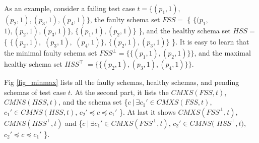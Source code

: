 {%
%
%
%
%
%
%
%

As an example, consider a failing test case $t = \{(p_{1}, 1),$ $ (p_{2}, 1), (p_{3}, 1), (p_{4}, 1)\}$, the faulty schema set $FSS =$ \{ $\{(p_{1}, $ $1), (p_{2}, 1), (p_{3}, 1)\}$, $\{(p_{1}, 1), (p_{2}, 1)\}$ \}, and the healthy schema set $HSS =$  \{ $\{(p_{2}, 1),$ $(p_{3}, 1),$ $(p_{4}, 1)\}$, $\{(p_{2}, 1), (p_{3}, 1)\}$ \}. It is easy to learn that the minimal faulty schema set $FSS^{\bot} = \{\{(p_{1}, 1), (p_{2}, 1)\}\}$, and the maximal healthy schema set $HSS^{\top}$ $= \{\{ (p_{2}, 1), (p_{3}, 1), (p_{4}, 1) \}\}$.

Fig \ref{fig_minmax} lists all the faulty schemas, healthy schemas, and pending schemas of test case $t$. At the second part, it lists the $CMXS(FSS, t)$, $CMNS(HSS, t)$, and the schema set \{$ c\ |\ \exists c_{1}' \in CMXS(FSS, t)$, $c_{1}' \in CMNS(HSS, t)$, $c_{2}' \preceq c \preceq c_{1}'$ \}. At last it shows $CMXS(FSS^{\bot}, t)$, $CMNS(HSS^{\top}, t)$ and  \{$ c\ |\ \exists c_{1}' \in CMXS(FSS^{\bot}, t)$, $ c_{2}' \in CMNS($ $HSS^{\top}, t)$, $c_{2}' \preceq c \preceq c_{1}'$ \}.

}
